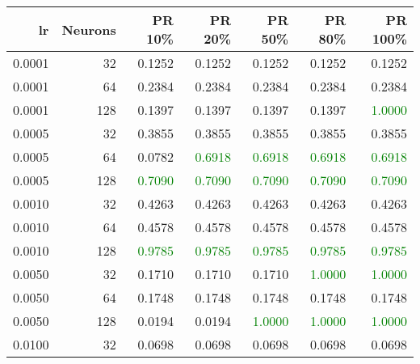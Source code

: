 \begin{tabular}{rrrrrrr}
\toprule
lr & Neurons & PR 10\% & PR 20\% & PR 50\% & PR 80\% & PR 100\% \\
\midrule
0.0001 & 32 & \textcolor{blu} {0.1252} & \textcolor{blu} {0.1252} & \textcolor{blu} {0.1252} & \textcolor{blu} {0.1252} & \textcolor{blu} {0.1252} \\
0.0001 & 64 & \textcolor{blu} {0.2384} & \textcolor{blu} {0.2384} & \textcolor{blu} {0.2384} & \textcolor{blu} {0.2384} & \textcolor{blu} {0.2384} \\
0.0001 & 128 & \textcolor{blu} {0.1397} & \textcolor{blu} {0.1397} & \textcolor{blu} {0.1397} & \textcolor{blu} {0.1397} & \textcolor{green} {1.0000} \\
0.0005 & 32 & \textcolor{blu} {0.3855} & \textcolor{blu} {0.3855} & \textcolor{blu} {0.3855} & \textcolor{blu} {0.3855} & \textcolor{blu} {0.3855} \\
0.0005 & 64 & \textcolor{blu} {0.0782} & \textcolor{green} {0.6918} & \textcolor{green} {0.6918} & \textcolor{green} {0.6918} & \textcolor{green} {0.6918} \\
0.0005 & 128 & \textcolor{green} {0.7090} & \textcolor{green} {0.7090} & \textcolor{green} {0.7090} & \textcolor{green} {0.7090} & \textcolor{green} {0.7090} \\
0.0010 & 32 & \textcolor{blu} {0.4263} & \textcolor{blu} {0.4263} & \textcolor{blu} {0.4263} & \textcolor{blu} {0.4263} & \textcolor{blu} {0.4263} \\
0.0010 & 64 & \textcolor{blu} {0.4578} & \textcolor{blu} {0.4578} & \textcolor{blu} {0.4578} & \textcolor{blu} {0.4578} & \textcolor{blu} {0.4578} \\
0.0010 & 128 & \textcolor{green} {0.9785} & \textcolor{green} {0.9785} & \textcolor{green} {0.9785} & \textcolor{green} {0.9785} & \textcolor{green} {0.9785} \\
0.0050 & 32 & \textcolor{blu} {0.1710} & \textcolor{blu} {0.1710} & \textcolor{blu} {0.1710} & \textcolor{green} {1.0000} & \textcolor{green} {1.0000} \\
0.0050 & 64 & \textcolor{blu} {0.1748} & \textcolor{blu} {0.1748} & \textcolor{blu} {0.1748} & \textcolor{blu} {0.1748} & \textcolor{blu} {0.1748} \\
0.0050 & 128 & \textcolor{blu} {0.0194} & \textcolor{blu} {0.0194} & \textcolor{green} {1.0000} & \textcolor{green} {1.0000} & \textcolor{green} {1.0000} \\
0.0100 & 32 & \textcolor{blu} {0.0698} & \textcolor{blu} {0.0698} & \textcolor{blu} {0.0698} & \textcolor{blu} {0.0698} & \textcolor{blu} {0.0698} \\

\end{tabular}
